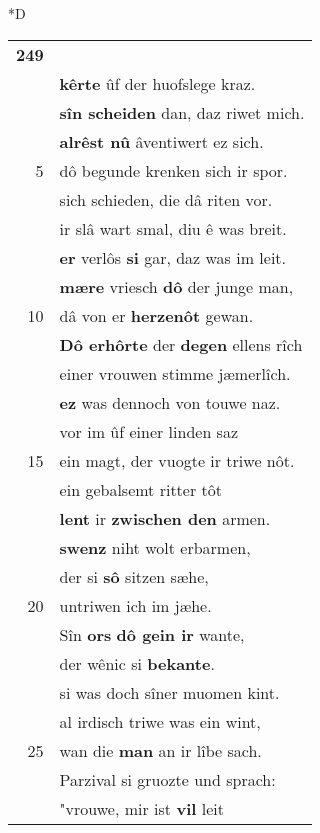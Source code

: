 \documentclass[8pt,a4paper,notitlepage]{article}
\begin{document}
\begin{table}[ht]
\begin{minipage}[t]{0.5\linewidth}
\small
\begin{center}*D
\end{center}
\begin{tabular}{rl}
\textbf{249} & \textbf{\begin{large}D\end{large}er valscheite} widersaz\\ 
 & \textbf{kêrte} ûf der huofslege kraz.\\ 
 & \textbf{sîn scheiden} dan, daz riwet mich.\\ 
 & \textbf{alrêst nû} âventiwert ez sich.\\ 
5 & dô begunde krenken sich ir spor.\\ 
 & sich schieden, die dâ riten vor.\\ 
 & ir slâ wart smal, diu ê was breit.\\ 
 & \textbf{er} verlôs \textbf{si} gar, daz was im leit.\\ 
 & \textbf{mære} vriesch \textbf{dô} der junge man,\\ 
10 & dâ von er \textbf{herzenôt} gewan.\\ 
 & \textbf{Dô erhôrte} der \textbf{degen} ellens rîch\\ 
 & einer vrouwen stimme jæmerlîch.\\ 
 & \textbf{ez} was dennoch von touwe naz.\\ 
 & vor im ûf einer linden saz\\ 
15 & ein magt, der vuogte ir triwe nôt.\\ 
 & ein gebalsemt ritter tôt\\ 
 & \textbf{lent} ir \textbf{zwischen den} armen.\\ 
 & \textbf{swenz} niht wolt erbarmen,\\ 
 & der si \textbf{sô} sitzen sæhe,\\ 
20 & untriwen ich im jæhe.\\ 
 & Sîn \textbf{ors} \textbf{dô gein ir} wante,\\ 
 & der wênic si \textbf{bekante}.\\ 
 & si was doch sîner muomen kint.\\ 
 & al irdisch triwe was ein wint,\\ 
25 & wan die \textbf{man} an ir lîbe sach.\\ 
 & Parzival si gruozte und sprach:\\ 
 & "vrouwe, mir ist \textbf{vil} leit\\ 

\end{tabular}
\end{minipage}
\end{table}
\end{document}
